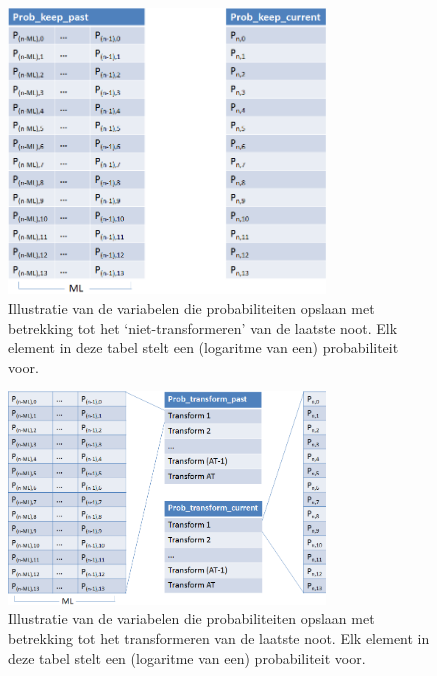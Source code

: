 \begin{figure}[!ht]
  \centering
  \includegraphics[width=0.75\textwidth]{4_Efficient_Toepassen_Transformatie/prob_keep_algo_2}
  \caption{Illustratie van de variabelen die probabiliteiten opslaan met betrekking tot het `niet-transformeren' van de laatste noot. Elk element in deze tabel stelt een (logaritme van een) probabiliteit voor.}
  \label{figuur:prob_keep_algo_2}
\end{figure}

\begin{figure}[!ht]
  \centering
  \includegraphics[width=0.75\textwidth]{4_Efficient_Toepassen_Transformatie/prob_transform_algo_2}
  \caption{Illustratie van de variabelen die probabiliteiten opslaan met betrekking tot het transformeren van de laatste noot. Elk element in deze tabel stelt een (logaritme van een) probabiliteit voor.}
  \label{figuur:prob_transform_algo_2}
\end{figure}

